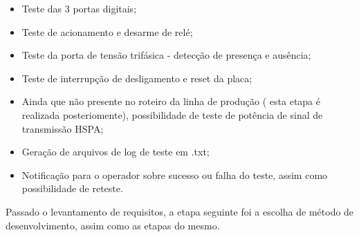 \begin{itemize}
            \item Teste das 3 portas digitais;
            \item Teste de acionamento e desarme de relé;
            \item Teste da porta de tensão trifásica - detecção de presença e ausência;
            \item Teste de interrupção de desligamento e reset da placa;
            \item Ainda que não presente no roteiro da linha de produção ( esta etapa é realizada posteriomente), possibilidade de teste de potência de sinal de transmissão HSPA;
            \item Geração de arquivos de log de teste em .txt;
            \item Notificação para o operador sobre sucesso ou falha do teste, assim como possibilidade de reteste.
        \end{itemize}
    Passado o levantamento de requisitos, a etapa seguinte foi a escolha de método de desenvolvimento, assim como as etapas do mesmo.
        
\begin{comment}
    \subsection{Workflow do projeto} %
       
       Para a realização deste trabalho dentro da empresa, optou-se por um desenvolvimento incremental a partir de uma solução minimamente funcional. O projeto foi realizado em etapas, em ciclos curtos de desenvolvimento que pudessem ser entregues para receber a contrapartida da empresa e ser validado. Algo próximo da metodologia Agile. Esse processo permitiu uma maior interatividade entre as necessidades da aplicação, como forma de repensar a escopo do programa, e também facilitou o acompanhamento da gerência com o andamento do produto.
       

Validação do projeto
Controle de Qualidade
Melhorias de processos
Melhorias no produto
Auxilio na Manutenção
\end{comment}    